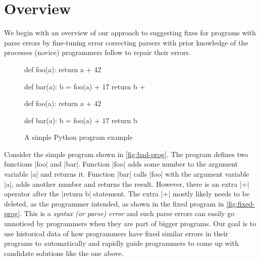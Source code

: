 \section{Overview}
\label{sec:overview}

We begin with an overview of our approach to suggesting fixes for programs with
parse errors by fine-tuning error correcting parsers with prior knowledge of the
processes (novice) programmers follow to repair their errors.

\begin{figure}[h]
\centering
\begin{minipage}[c]{0.48\linewidth}
\begin{ecode}
def foo(a):
  return a + 42

def bar(a):
  b = foo(a) + 17
  return b +
\end{ecode}
\label{fig:bad-prog}
\end{minipage}%
\hspace{0.02\linewidth}%
\begin{minipage}[c]{0.48\linewidth}
\begin{ecode}
def foo(a):
  return a + 42

def bar(a):
  b = foo(a) + 17
  return b
\end{ecode}
\label{fig:fixed-prog}
\end{minipage}
\caption{A simple Python program example}
\label{fig:example-prog}
\end{figure}


 Consider the simple program shown in
\autoref{fig:bad-prog}. The program defines two functions |foo| and |bar|.
Function |foo| adds some number to the argument variable |a| and returns it.
Function |bar| calls |foo| with the argument variable |a|, adds another number
and returns the result. However, there is an extra |+| operator after the
|return b| statement. The extra |+| mostly likely needs to be deleted, as the
programmer intended, as shown in the fixed program in \autoref{fig:fixed-prog}.
This is a \emph{syntax (or parse) error} and such parse errors can easily go
unnoticed \citep{Denny_2012, Ahadi_2018, VanDerSpek_2005} by programmers when
they are part of bigger programs. Our goal is to use historical data of how
programmers have fixed similar errors in their programs to automatically and
rapidly guide programmers to come up with candidate solutions like the one
above.


